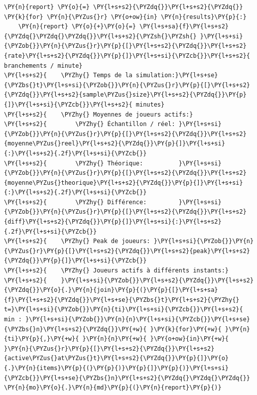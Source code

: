     \begin{tcolorbox}[breakable, size=fbox, boxrule=1pt, pad at break*=1mm,colback=cellbackground, colframe=cellborder]
\begin{Verbatim}[commandchars=\\\{\}]
\PY{n}{report} \PY{o}{=} \PY{l+s+s2}{\PYZdq{}}\PY{l+s+s2}{\PYZdq{}}
\PY{k}{for} \PY{n}{\PYZus{}r} \PY{o+ow}{in} \PY{n}{results}\PY{p}{:}
    \PY{n}{report} \PY{o}{+}\PY{o}{=} \PY{l+s+sa}{f}\PY{l+s+s2}{\PYZdq{}\PYZdq{}\PYZdq{}}\PY{l+s+s2}{\PYZsh{}\PYZsh{} }\PY{l+s+si}{\PYZob{}}\PY{n}{\PYZus{}r}\PY{p}{[}\PY{l+s+s2}{\PYZdq{}}\PY{l+s+s2}{rate}\PY{l+s+s2}{\PYZdq{}}\PY{p}{]}\PY{l+s+si}{\PYZcb{}}\PY{l+s+s2}{ branchements / minute}
\PY{l+s+s2}{    \PYZhy{} Temps de la simulation:}\PY{l+s+se}{\PYZbs{}t}\PY{l+s+si}{\PYZob{}}\PY{n}{\PYZus{}r}\PY{p}{[}\PY{l+s+s2}{\PYZdq{}}\PY{l+s+s2}{sample\PYZus{}size}\PY{l+s+s2}{\PYZdq{}}\PY{p}{]}\PY{l+s+si}{\PYZcb{}}\PY{l+s+s2}{ minutes}
\PY{l+s+s2}{    \PYZhy{} Moyennes de joueurs actifs:}
\PY{l+s+s2}{        \PYZhy{} Échantillon / réel: }\PY{l+s+si}{\PYZob{}}\PY{n}{\PYZus{}r}\PY{p}{[}\PY{l+s+s2}{\PYZdq{}}\PY{l+s+s2}{moyenne\PYZus{}reel}\PY{l+s+s2}{\PYZdq{}}\PY{p}{]}\PY{l+s+si}{:}\PY{l+s+s2}{.2f}\PY{l+s+si}{\PYZcb{}}
\PY{l+s+s2}{        \PYZhy{} Théorique:          }\PY{l+s+si}{\PYZob{}}\PY{n}{\PYZus{}r}\PY{p}{[}\PY{l+s+s2}{\PYZdq{}}\PY{l+s+s2}{moyenne\PYZus{}theorique}\PY{l+s+s2}{\PYZdq{}}\PY{p}{]}\PY{l+s+si}{:}\PY{l+s+s2}{.2f}\PY{l+s+si}{\PYZcb{}}
\PY{l+s+s2}{        \PYZhy{} Différence:         }\PY{l+s+si}{\PYZob{}}\PY{n}{\PYZus{}r}\PY{p}{[}\PY{l+s+s2}{\PYZdq{}}\PY{l+s+s2}{diff}\PY{l+s+s2}{\PYZdq{}}\PY{p}{]}\PY{l+s+si}{:}\PY{l+s+s2}{.2f}\PY{l+s+si}{\PYZcb{}}
\PY{l+s+s2}{    \PYZhy{} Peak de joueurs: }\PY{l+s+si}{\PYZob{}}\PY{n}{\PYZus{}r}\PY{p}{[}\PY{l+s+s2}{\PYZdq{}}\PY{l+s+s2}{peak}\PY{l+s+s2}{\PYZdq{}}\PY{p}{]}\PY{l+s+si}{\PYZcb{}}
\PY{l+s+s2}{    \PYZhy{} Joueurs actifs à différents instants:}
\PY{l+s+s2}{    }\PY{l+s+si}{\PYZob{}}\PY{l+s+s2}{\PYZdq{}}\PY{l+s+s2}{\PYZdq{}}\PY{o}{.}\PY{n}{join}\PY{p}{(}\PY{p}{[}\PY{l+s+sa}{f}\PY{l+s+s2}{\PYZdq{}}\PY{l+s+se}{\PYZbs{}t}\PY{l+s+s2}{\PYZhy{} t=}\PY{l+s+si}{\PYZob{}}\PY{n}{ti}\PY{l+s+si}{\PYZcb{}}\PY{l+s+s2}{ min : }\PY{l+s+si}{\PYZob{}}\PY{n}{n}\PY{l+s+si}{\PYZcb{}}\PY{l+s+se}{\PYZbs{}n}\PY{l+s+s2}{\PYZdq{}}\PY{+w}{ }\PY{k}{for}\PY{+w}{ }\PY{n}{ti}\PY{p}{,}\PY{+w}{ }\PY{n}{n}\PY{+w}{ }\PY{o+ow}{in}\PY{+w}{ }\PY{n}{\PYZus{}r}\PY{p}{[}\PY{l+s+s2}{\PYZdq{}}\PY{l+s+s2}{active\PYZus{}at\PYZus{}t}\PY{l+s+s2}{\PYZdq{}}\PY{p}{]}\PY{o}{.}\PY{n}{items}\PY{p}{(}\PY{p}{)}\PY{p}{]}\PY{p}{)}\PY{l+s+si}{\PYZcb{}}\PY{l+s+se}{\PYZbs{}n}\PY{l+s+s2}{\PYZdq{}\PYZdq{}\PYZdq{}}
\PY{n}{mo}\PY{o}{.}\PY{n}{md}\PY{p}{(}\PY{n}{report}\PY{p}{)}
\end{Verbatim}
\end{tcolorbox}



